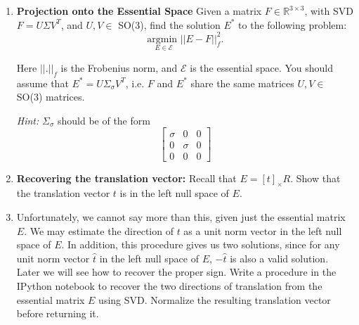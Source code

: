 \begin{enumerate}
\item{\textbf{Projection onto the Essential Space}}
    Given a matrix $F \in \mathbb{R}^{3 \times 3}$, with SVD $F = U\Sigma V^T$, and $U,V \in$ SO(3), find the solution $E^{*}$ to the following problem:
    \begin{equation}
        \underset{ E \in \mathcal{E}}{\text{argmin }} ||E - F||_{f}^{2}.
    \end{equation}
    
    Here $||.||_{f}$ is the Frobenius norm, and $\mathcal{E}$ is the essential space. You should assume that $ E^{*} = U \Sigma_{\sigma} V^{T}$, i.e. $F$ and $E^{*}$ share the same matrices $U,V\in$ SO(3) matrices. 
    
    \textit{Hint:} $\Sigma_{\sigma}$ should be of the form 
    \begin{equation*}
        \begin{bmatrix}
        \sigma & 0 & 0 \\
        0 & \sigma & 0 \\
        0 & 0 & 0
        \end{bmatrix}
    \end{equation*}
    \newline
    
    \sol{}
    
\item{\textbf{Recovering the translation vector:}}
    Recall that $E = [t]_{\times}R$. Show that the translation vector $t$ is in the left null space of $E$. 
    \newline
    
\sol{}
\item
    Unfortunately, we cannot say more than this, given just the essential matrix $E$. We may estimate the direction of $t$ as a unit norm vector in the left null space of $E$. In addition, this procedure gives us two solutions, since for any unit norm vector $\hat{t}$ in the left null space of $E$, $-\hat{t}$ is also a valid solution. Later we will see how to recover the proper sign. 
    \newline 
    \newline
    Write a procedure in the IPython notebook to recover the two directions of translation from the essential matrix $E$ using SVD. Normalize the resulting translation vector before returning it.
    \newline
    

\end{enumerate}
